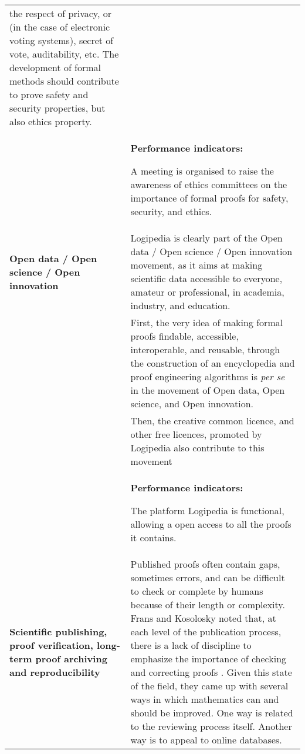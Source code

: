 \begin{longtable}{|p{}|p{}|}
the respect of privacy, or (in the case of electronic voting systems), 
secret of vote, auditability, etc.
The development of formal methods should contribute to prove 
safety and security properties, but also ethics property.
\\
&
\colorbox{color2}{\bf Performance indicators:}
\begin{compactitem}
\item A meeting is organised to raise the awareness of ethics committees
  on the importance of formal proofs for safety, security, and ethics.
\end{compactitem}
\\
\hline
{\bf Open data / Open science / Open innovation}
&
Logipedia is clearly part of the Open data / Open science / Open
innovation movement, as it aims at making scientific data accessible
to everyone, amateur or professional, in academia, industry, and
education.\\
&
\hspace{0.4cm}
First, the very idea of making formal proofs findable, accessible,
interoperable, and reusable, through the construction of an
encyclopedia and proof engineering algorithms is {\em per se} in the
movement of Open data, Open science, and Open innovation.\\
&
\hspace{0.4cm}
Then, the creative common licence, and other free licences, promoted by 
Logipedia also contribute to this movement\\
&
\colorbox{color2}{\bf Performance indicators:}
\begin{compactitem}
\item The platform Logipedia is functional, allowing a open access to all the proofs it contains.
\end{compactitem}
\\
\hline
{\bf Scientific publishing, proof verification, long-term proof archiving and reproducibility}
&
Published proofs often contain gaps, sometimes errors, and can be difficult
to check or complete by humans because of their length or
complexity. Frans and Kosolosky noted that, at each level of the
publication process, there is a lack of discipline to emphasize the
importance of checking and correcting proofs
\cite{frans14theoria}. Given this state of the field, they came up
with several ways in which mathematics can and should be improved.
One way is related to the reviewing process itself. Another
way is to appeal to online databases.


\end{longtable}

